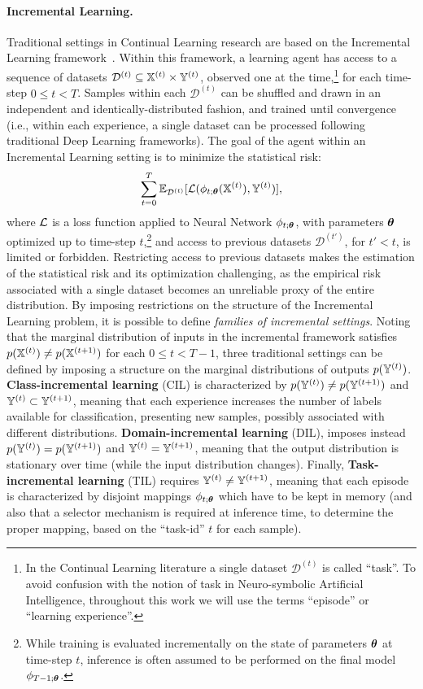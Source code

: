 \paragraph{Incremental Learning.}
Traditional settings in Continual Learning research are based on the Incremental Learning framework~\cite{de2021continual}. Within this framework, a learning agent has access to a sequence of datasets $\mathcal{D}^{(t)} \subseteq {\mathbb{X}}^{(t)} \times {\mathbb{Y}}^{(t)}$, observed one at the time,\footnote{In the Continual Learning literature a single dataset $\mathcal{D}^{(t)}$ is called ``task''. To avoid confusion with the notion of task in Neuro-symbolic Artificial Intelligence, throughout this work we will use the terms ``episode'' or ``learning experience''.} for each time-step $0 \leq t < T$. Samples within each $\mathcal{D}^{(t)}$ can be shuffled and drawn in an independent and identically-distributed fashion, and trained until convergence (i.e., within each experience, a single dataset can be processed following traditional Deep Learning frameworks).
The goal of the agent within an Incremental Learning setting is to minimize the statistical risk:
$$\sum\limits_{t=0}^T \mathbb{E}_{\mathcal{D}^{(t)}}[{\mathcal{L}}(\phi_{t;{\bm{\theta}}}({\mathbb{X}}^{(t)}), {\mathbb{Y}}^{(t)})],$$
where ${\mathcal{L}}$ is a loss function applied to Neural Network $\phi_{t;{\bm{\theta}}}$, with parameters ${\bm{\theta}}$ optimized up to  time-step $t$,\footnote{While training is evaluated incrementally on the state of parameters ${\bm{\theta}}$ at time-step $t$, inference is often assumed to be performed on the final model $\phi_{T-1;{\bm{\theta}}}$.} and access to previous datasets $\mathcal{D}^{(t')}$, for $t' < t$, is limited or forbidden.
Restricting access to previous datasets makes the estimation of the statistical risk and its optimization challenging, as the empirical risk associated with a single dataset becomes an unreliable proxy of the entire distribution.
By imposing restrictions on the structure of the Incremental Learning problem, it is possible to define \textit{families of incremental settings}. Noting that the marginal distribution of inputs in the incremental framework satisfies $p({\mathbb{X}}^{(t)}) \not = p({\mathbb{X}}^{(t+1)})$ for each $0 \leq t < T-1$, three traditional settings can be defined by imposing a structure on the marginal distributions of outputs $p({\mathbb{Y}}^{(t)})$.
\textbf{Class-incremental learning} (CIL) is characterized by $p({\mathbb{Y}}^{(t)}) \not = p({\mathbb{Y}}^{(t+1)})$ and ${\mathbb{Y}}^{(t)} \subset {\mathbb{Y}}^{(t+1)}$, meaning that each experience increases the number of labels available for classification, presenting new samples, possibly associated with different distributions.
\textbf{Domain-incremental learning} (DIL), imposes instead $p({\mathbb{Y}}^{(t)}) = p({\mathbb{Y}}^{(t+1)})$ and ${\mathbb{Y}}^{(t)} = {\mathbb{Y}}^{(t+1)}$, meaning that the output distribution is stationary over time (while the input distribution changes).
Finally, \textbf{Task-incremental learning} (TIL) requires ${\mathbb{Y}}^{(t)} \not = {\mathbb{Y}}^{(t+1)}$, meaning that each episode is characterized by disjoint mappings $\phi_{t;{\bm{\theta}}}$ which have to be kept in memory (and also that a selector mechanism is required at inference time, to determine the proper mapping, based on the ``task-id'' $t$ for each sample).


